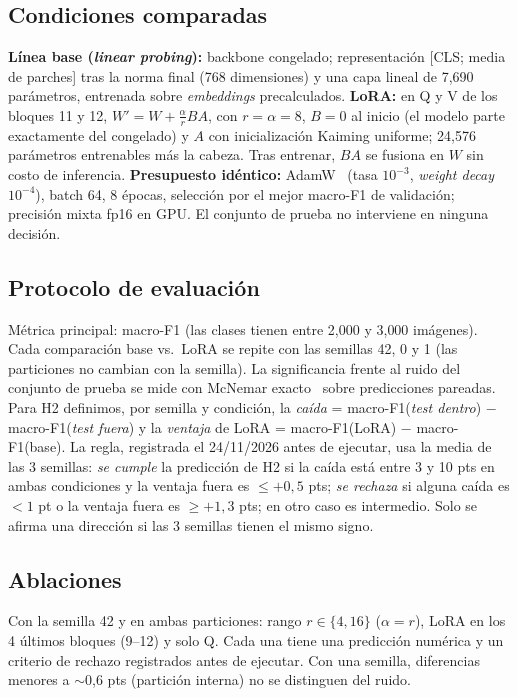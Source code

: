 \documentclass[conference,a4paper]{IEEEtran}
\begin{document}
\subsection{Condiciones comparadas}
\textbf{Línea base (\emph{linear probing}):} backbone congelado; representación [CLS; media de parches] tras la norma final (768 dimensiones) y una capa lineal de 7{,}690 parámetros, entrenada sobre \emph{embeddings} precalculados.
\textbf{LoRA:} en Q y V de los bloques 11 y 12, $W'=W+\frac{\alpha}{r}BA$, con $r{=}\alpha{=}8$, $B{=}0$ al inicio (el modelo parte exactamente del congelado) y $A$ con inicialización Kaiming uniforme; 24{,}576 parámetros entrenables más la cabeza. Tras entrenar, $BA$ se fusiona en $W$ sin costo de inferencia.
\textbf{Presupuesto idéntico:} AdamW~\cite{loshchilov2019} (tasa $10^{-3}$, \emph{weight decay} $10^{-4}$), batch 64, 8 épocas, selección por el mejor macro-F1 de validación; precisión mixta fp16 en GPU. El conjunto de prueba no interviene en ninguna decisión.

\subsection{Protocolo de evaluación}
Métrica principal: macro-F1 (las clases tienen entre 2{,}000 y 3{,}000 imágenes). Cada comparación base vs.\ LoRA se repite con las semillas 42, 0 y 1 (las particiones no cambian con la semilla). La significancia frente al ruido del conjunto de prueba se mide con McNemar exacto~\cite{mcnemar1947} sobre predicciones pareadas. Para H2 definimos, por semilla y condición, la \emph{caída} = macro-F1(\emph{test dentro}) $-$ macro-F1(\emph{test fuera}) y la \emph{ventaja} de LoRA = macro-F1(LoRA) $-$ macro-F1(base). La regla, registrada el 24/11/2026 antes de ejecutar, usa la media de las 3 semillas: \emph{se cumple} la predicción de H2 si la caída está entre 3 y 10 pts en ambas condiciones y la ventaja fuera es $\le{+}0{,}5$ pts; \emph{se rechaza} si alguna caída es $<1$ pt o la ventaja fuera es $\ge{+}1{,}3$ pts; en otro caso es intermedio. Solo se afirma una dirección si las 3 semillas tienen el mismo signo.

\subsection{Ablaciones}
Con la semilla 42 y en ambas particiones: rango $r\in\{4,16\}$ ($\alpha{=}r$), LoRA en los 4 últimos bloques (9--12) y solo Q. Cada una tiene una predicción numérica y un criterio de rechazo registrados antes de ejecutar. Con una semilla, diferencias menores a $\sim$0{,}6 pts (partición interna) no se distinguen del ruido.
\end{document}
